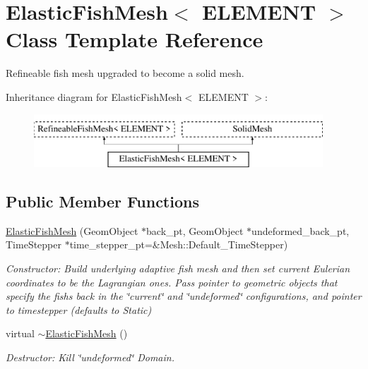 \hypertarget{classElasticFishMesh}{}\section{Elastic\+Fish\+Mesh$<$ E\+L\+E\+M\+E\+NT $>$ Class Template Reference}
\label{classElasticFishMesh}


Refineable fish mesh upgraded to become a solid mesh.  


Inheritance diagram for Elastic\+Fish\+Mesh$<$ E\+L\+E\+M\+E\+NT $>$\+:\begin{figure}[H]
\begin{center}
\leavevmode
\includegraphics[height=2.000000cm]{classElasticFishMesh}
\end{center}
\end{figure}
\subsection*{Public Member Functions}
\begin{DoxyCompactItemize}
\item 
\hyperlink{classElasticFishMesh_a76c4d63d48b9ee48c3742e55057cfba0}{Elastic\+Fish\+Mesh} (Geom\+Object $\ast$back\+\_\+pt, Geom\+Object $\ast$undeformed\+\_\+back\+\_\+pt, Time\+Stepper $\ast$time\+\_\+stepper\+\_\+pt=\&Mesh\+::\+Default\+\_\+\+Time\+Stepper)
\begin{DoxyCompactList}\small\item\em Constructor\+: Build underlying adaptive fish mesh and then set current Eulerian coordinates to be the Lagrangian ones. Pass pointer to geometric objects that specify the fish\textquotesingle{}s back in the \char`\"{}current\char`\"{} and \char`\"{}undeformed\char`\"{} configurations, and pointer to timestepper (defaults to Static) \end{DoxyCompactList}\item 
virtual \hyperlink{classElasticFishMesh_ab8e084bb7551b9765b95dc38e82ab1be}{$\sim$\+Elastic\+Fish\+Mesh} ()
\begin{DoxyCompactList}\small\item\em Destructor\+: Kill \char`\"{}undeformed\char`\"{} Domain. \end{DoxyCompactList}\end{DoxyCompactItemize}
